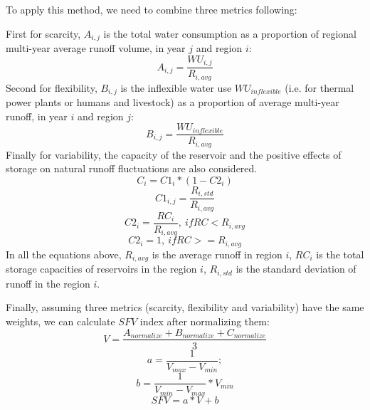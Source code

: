 \documentclass[9pt,twoside,lineno]{pnas-new}
\begin{document}
	To apply this method, we need to combine three metrics following: 
	
	First for scarcity, $A_{i, j}$ is the total water consumption as a proportion of regional multi-year average runoff volume, in year $j$ and region $i$:
	$$ A_{i, j} = \frac{WU_{i,j}}{R_{i, avg}} $$
	Second for flexibility, $B_{i, j}$ is the inflexible water use $WU_{inflexible}$ (i.e. for thermal power plants or humans and livestock) as a proportion of average multi-year runoff, in year $i$ and region $j$:
	$$ B_{i, j} = \frac{WU_{inflexible}}{R_{i, avg}} $$
	Finally for variability, the capacity of the reservoir and the positive effects of storage on natural runoff fluctuations are also considered.
	$$ C_i = C1_i * (1 - C2_i) $$
	$$ C1_{i, j} = \frac{R_{i, std}}{R_{i, avg}} $$
	$$ C2_{i} = \frac{RC_{i}}{R_{i, avg}}, \ if RC < R_{i, avg} $$
	$$ C2_{i} = 1, \ if RC >= R_{i, avg} $$
	In all the equations above, $R_{i, avg}$ is the average runoff in region $i$, $RC_i$ is the total storage capacities of reservoirs in the region $i$, $R_{i, std}$ is the standard deviation of runoff in the region $i$.

	Finally, assuming three metrics (scarcity, flexibility and variability) have the same weights, we can calculate $SFV$ index after normalizing them:
	$$ V = \frac{A_{normalize} + B_{normalize} + C_{normalize}}{3} $$
	$$ a = \frac{1}{V_{max} - V_{min}}; $$
	$$ b = \frac{1}{V_{min} - V_{max}} * V_{min} $$
	$$ SFV = a * V + b $$
\end{document}
